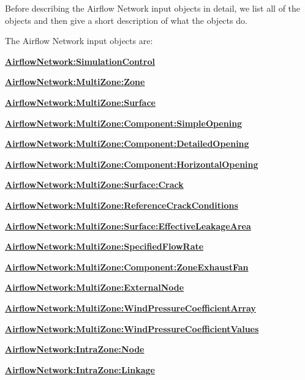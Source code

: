 Before describing the Airflow Network input objects in detail, we list all of the objects and then give a short description of what the objects do.

The Airflow Network input objects are:

\textbf{\hyperref[airflownetworksimulationcontrol]{AirflowNetwork:\hyperref[simulationcontrol]{SimulationControl}}}

\textbf{\hyperref[airflownetworkmultizonezone]{AirflowNetwork:MultiZone:Zone}}

\textbf{\hyperref[airflownetworkmultizonesurface]{AirflowNetwork:MultiZone:Surface}}

\textbf{\hyperref[airflownetworkmultizonecomponentsimpleopening]{AirflowNetwork:MultiZone:Component:SimpleOpening}}

\textbf{\hyperref[airflownetworkmultizonecomponentdetailedopening]{AirflowNetwork:MultiZone:Component:DetailedOpening}}

\textbf{\hyperref[airflownetworkmultizonecomponenthorizontalopening]{AirflowNetwork:MultiZone:Component:HorizontalOpening}}

\textbf{\hyperref[airflownetworkmultizonesurfacecrack]{AirflowNetwork:MultiZone:Surface:Crack}}

\textbf{\hyperref[airflownetworkmultizonereferencecrackconditions]{AirflowNetwork:MultiZone:ReferenceCrackConditions}}

\textbf{\hyperref[airflownetworkmultizonesurfaceeffectiveleakagearea]{AirflowNetwork:MultiZone:Surface:EffectiveLeakageArea}}

\textbf{\hyperref[airflownetworkmultizonespecifiedflow]{AirflowNetwork:MultiZone:SpecifiedFlowRate}}

\textbf{\hyperref[airflownetworkmultizonecomponentzoneexhaustfan]{AirflowNetwork:MultiZone:Component:ZoneExhaustFan}}

\textbf{\hyperref[airflownetworkmultizoneexternalnode]{AirflowNetwork:MultiZone:ExternalNode}}

\textbf{\hyperref[airflownetworkmultizonewindpressurecoefficientarray]{AirflowNetwork:MultiZone:WindPressureCoefficientArray}}

\textbf{\hyperref[airflownetworkmultizonewindpressurecoefficientvalues]{AirflowNetwork:MultiZone:WindPressureCoefficientValues}}

\textbf{\hyperref[airflownetworkintrazonenode]{AirflowNetwork:IntraZone:Node}}

\textbf{\hyperref[airflownetworkintrazonelinkage]{AirflowNetwork:IntraZone:Linkage}}

